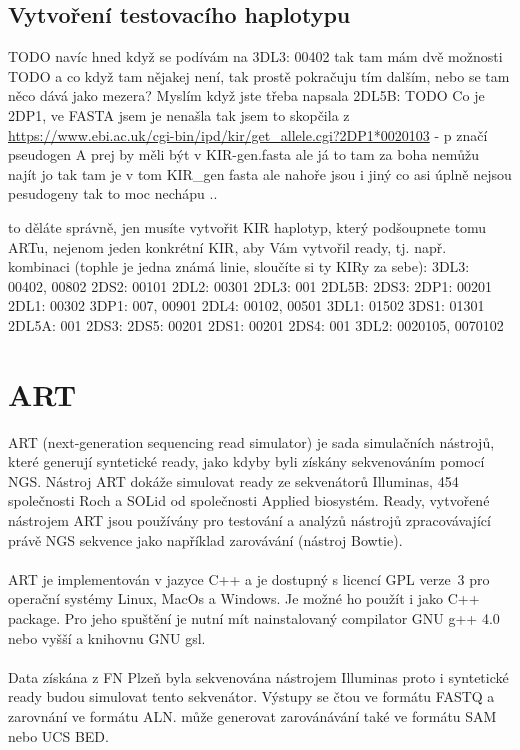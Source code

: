 \documentclass[czech,DP]{thesiskiv}
\numberwithin{equation}{section}
\begin{document}
\subsection{Vytvoření testovacího haplotypu}

TODO navíc hned když se podívám na 3DL3: 00402 tak tam mám dvě možnosti
TODO a co když tam nějakej není, tak prostě pokračuju tím dalším, nebo se tam něco dává jako mezera? Myslím když jste třeba napsala 2DL5B:
TODO Co je 2DP1, ve FASTA jsem je nenašla tak jsem to skopčila z \url{https://www.ebi.ac.uk/cgi-bin/ipd/kir/get_allele.cgi?2DP1*0020103} - p značí pseudogen
A prej by měli být v KIR-gen.fasta ale já to tam za boha nemůžu najít
jo tak tam je v tom KIR\_gen fasta
ale nahoře jsou i jiný co asi úplně nejsou pesudogeny tak to moc nechápu ..
 
to děláte správně, jen musíte vytvořit KIR haplotyp, který podšoupnete tomu ARTu, nejenom jeden konkrétní KIR, aby Vám vytvořil ready, tj. např. kombinaci (tophle je jedna známá linie, sloučíte si ty KIRy za sebe):
3DL3: 00402, 00802
2DS2: 00101
2DL2: 00301
2DL3: 001
2DL5B:
2DS3:
2DP1: 00201
2DL1: 00302
3DP1: 007, 00901
2DL4: 00102, 00501
3DL1: 01502
3DS1: 01301
2DL5A: 001
2DS3:
2DS5: 00201
2DS1: 00201
2DS4: 001
3DL2: 0020105, 0070102


\section{ART}
ART (next-generation sequencing read simulator) je sada simulačních nástrojů, které generují syntetické ready, jako kdyby byli získány sekvenováním pomocí NGS. Nástroj ART dokáže simulovat ready ze sekvenátorů Illuminas, 454 společnosti Roch a SOLid od společnosti Applied biosystém. Ready, vytvořené nástrojem ART jsou používány pro testování a analýzů nástrojů zpracovávající právě NGS sekvence jako například zarovávání (nástroj Bowtie). \cite{art}
\\
\\
ART je implementován v jazyce C++ a je dostupný s licencí GPL verze~3 pro operační systémy Linux, MacOs a Windows. Je možné ho použít i jako C++ package. Pro jeho spuštění je nutní mít nainstalovaný compilator GNU g++ 4.0 nebo vyšší a knihovnu GNU gsl. 
\\
\\
Data získána z FN Plzeň byla sekvenována nástrojem Illuminas proto i syntetické ready budou simulovat tento sekvenátor.    
 Výstupy se čtou ve formátu FASTQ a zarovnání ve formátu ALN. může generovat zarovánávání také ve formátu SAM nebo UCS BED. 
\end{document}
